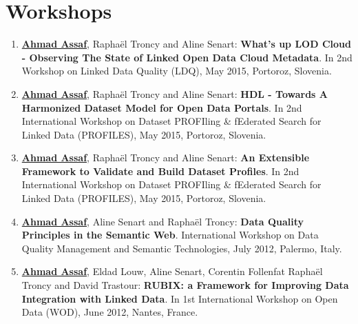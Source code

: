 \section*{Workshops}\label{sec:workshop}
\begin{enumerate}
\item \underline{\textbf{Ahmad Assaf}}, {R}apha{\"e}l {T}roncy and {A}line {S}enart: \textbf{{W}hat's up {LOD} Cloud - Observing The State of Linked Open Data Cloud Metadata}. In 2nd Workshop on Linked Data Quality (LDQ), May 2015, {P}ortoroz, {S}lovenia.
\item \underline{\textbf{Ahmad Assaf}}, {R}apha{\"e}l {T}roncy and {A}line {S}enart: \textbf{{HDL} - Towards A Harmonized Dataset Model for Open Data Portals}. In 2nd {I}nternational {W}orkshop on {D}ataset {PROFI}ling \& f{E}derated {S}earch for {L}inked {D}ata (PROFILES), May 2015, {P}ortoroz, {S}lovenia.
\item \underline{\textbf{Ahmad Assaf}}, {R}apha{\"e}l {T}roncy and {A}line {S}enart: \textbf{{A}n Extensible Framework to Validate and Build Dataset Profiles}. In 2nd {I}nternational {W}orkshop on {D}ataset {PROFI}ling \& f{E}derated {S}earch for {L}inked {D}ata (PROFILES), May 2015, {P}ortoroz, {S}lovenia.
\item \underline{\textbf{Ahmad Assaf}}, {A}line {S}enart and {R}apha{\"e}l {T}roncy: \textbf{{D}ata Quality Principles in the Semantic Web}. International Workshop on Data Quality Management and Semantic Technologies, July 2012, {P}alermo, {I}taly.
\item \underline{\textbf{Ahmad Assaf}}, {E}ldad {L}ouw, {A}line {S}enart, {C}orentin {F}ollenfat {R}apha{\"e}l {T}roncy and {D}avid {T}rastour: \textbf{{RUBIX}: a Framework for Improving Data Integration with Linked Data}. In 1st International Workshop on Open Data (WOD), June 2012, {N}antes, {F}rance.
\end{enumerate}